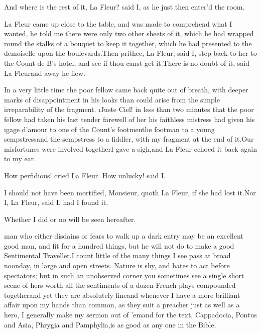 \documentclass[twoside]{article}
\begin{document}
\tskk And where is the rest of it, La
Fleur? said I, as he just then enter’d the
room.




 

 La Fleur came up close to
the table, and was made to comprehend what
I wanted, he told me there were only two
other sheets of it, which he had wrapped
round the stalks of a bouquet to keep it
together, which he had presented to the
demoiselle upon the boulevards.\tskk Then
prithee, La Fleur, said I, step back to
her to the Count de B\anon’s hotel, and
see if thou canst get it.\tskk There is no
doubt of it, said La Fleur\tskk and away
he flew.

In a very little time the poor fellow came
back quite out of breath, with deeper
marks of disappointment in his looks than
could arise from the simple irreparability
of the fragment.  \i{Juste Ciel}! in less
than two minutes that the poor fellow had
taken his last tender farewell of her\tskk
his faithless mistress had given his
\i{gage d’amour} to one of the Count’s
footmen\tskk the footman to a young
sempstress\tskk and the sempstress to a
fiddler, with my fragment at the end of
it.\tskk Our misfortunes were involved
together\tskk I gave a sigh,\tskk and La
Fleur echoed it back again to my ear.


\tskk How perfidious! cried La Fleur.\tskk
How unlucky! said I.

\tskk I should not have been mortified,
Monsieur, quoth La Fleur, if she had lost
it.\tskk Nor I, La Fleur, said I, had I
found it.

Whether I did or no will be seen
hereafter.





\vskip 6pt


 man who either disdains or
fears to walk up a dark entry may be an
excellent good man, and fit for a hundred
things, but he will not do to make a good
Sentimental Traveller.\tskk I count little
of the many things I see pass at broad
noonday, in large and open streets.\tskk
Nature is shy, and hates to act before
spectators; but in such an unobserved
corner you sometimes see a single short
scene of hers worth all the sentiments of
a dozen French plays compounded
together\tskk and yet they are absolutely
fine\tskk and whenever I have a more
brilliant affair upon my hands than
common, as they suit a preacher just as
well as a hero, I generally make my sermon
out of ’em\tskk and for the text,\tskk
\lqq Cappadocia, Pontus and Asia, Phrygia and
Pamphylia,\rqq \tskk is as good as any one in
the Bible.
\end{document}

